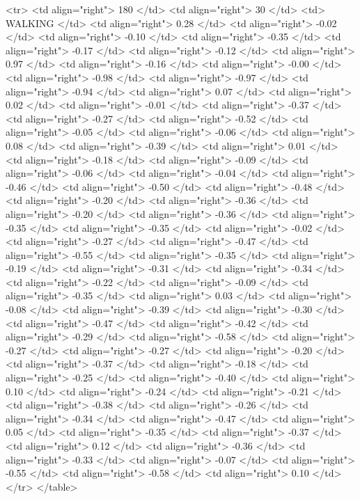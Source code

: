   <tr> <td align="right"> 180 </td> <td align="right">  30 </td> <td> WALKING </td> <td align="right"> 0.28 </td> <td align="right"> -0.02 </td> <td align="right"> -0.10 </td> <td align="right"> -0.35 </td> <td align="right"> -0.17 </td> <td align="right"> -0.12 </td> <td align="right"> 0.97 </td> <td align="right"> -0.16 </td> <td align="right"> -0.00 </td> <td align="right"> -0.98 </td> <td align="right"> -0.97 </td> <td align="right"> -0.94 </td> <td align="right"> 0.07 </td> <td align="right"> 0.02 </td> <td align="right"> -0.01 </td> <td align="right"> -0.37 </td> <td align="right"> -0.27 </td> <td align="right"> -0.52 </td> <td align="right"> -0.05 </td> <td align="right"> -0.06 </td> <td align="right"> 0.08 </td> <td align="right"> -0.39 </td> <td align="right"> 0.01 </td> <td align="right"> -0.18 </td> <td align="right"> -0.09 </td> <td align="right"> -0.06 </td> <td align="right"> -0.04 </td> <td align="right"> -0.46 </td> <td align="right"> -0.50 </td> <td align="right"> -0.48 </td> <td align="right"> -0.20 </td> <td align="right"> -0.36 </td> <td align="right"> -0.20 </td> <td align="right"> -0.36 </td> <td align="right"> -0.35 </td> <td align="right"> -0.35 </td> <td align="right"> -0.02 </td> <td align="right"> -0.27 </td> <td align="right"> -0.47 </td> <td align="right"> -0.55 </td> <td align="right"> -0.35 </td> <td align="right"> -0.19 </td> <td align="right"> -0.31 </td> <td align="right"> -0.34 </td> <td align="right"> -0.22 </td> <td align="right"> -0.09 </td> <td align="right"> -0.35 </td> <td align="right"> 0.03 </td> <td align="right"> -0.08 </td> <td align="right"> -0.39 </td> <td align="right"> -0.30 </td> <td align="right"> -0.47 </td> <td align="right"> -0.42 </td> <td align="right"> -0.29 </td> <td align="right"> -0.58 </td> <td align="right"> -0.27 </td> <td align="right"> -0.27 </td> <td align="right"> -0.20 </td> <td align="right"> -0.37 </td> <td align="right"> -0.18 </td> <td align="right"> -0.25 </td> <td align="right"> -0.40 </td> <td align="right"> 0.10 </td> <td align="right"> -0.24 </td> <td align="right"> -0.21 </td> <td align="right"> -0.38 </td> <td align="right"> -0.26 </td> <td align="right"> -0.34 </td> <td align="right"> -0.47 </td> <td align="right"> 0.05 </td> <td align="right"> -0.35 </td> <td align="right"> -0.37 </td> <td align="right"> 0.12 </td> <td align="right"> -0.36 </td> <td align="right"> -0.33 </td> <td align="right"> -0.07 </td> <td align="right"> -0.55 </td> <td align="right"> -0.58 </td> <td align="right"> 0.10 </td> </tr>
   </table>

